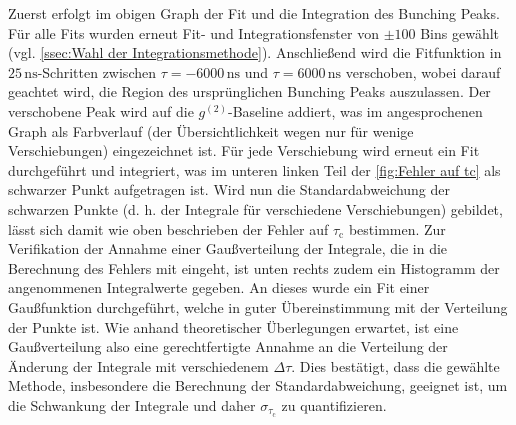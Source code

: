 Zuerst erfolgt im obigen Graph der Fit und die Integration des Bunching Peaks. 
Für alle Fits wurden erneut Fit- und Integrationsfenster von $\pm 100$ Bins gewählt (vgl. \autoref{ssec:Wahl der Integrationsmethode}). 
Anschließend wird die Fitfunktion in $25\,\mathrm{ns}$-Schritten zwischen $\tau = -6000\,\mathrm{ns}$ und $\tau = 6000\,\mathrm{ns}$ verschoben, wobei darauf geachtet wird, die Region des ursprünglichen Bunching Peaks auszulassen. 
Der verschobene Peak wird auf die $g^{(2)}$-Baseline addiert, was im angesprochenen Graph als Farbverlauf (der Übersichtlichkeit wegen nur für wenige Verschiebungen) eingezeichnet ist. 
Für jede Verschiebung wird erneut ein Fit durchgeführt und integriert, was im unteren linken Teil der \autoref{fig:Fehler auf tc} als schwarzer Punkt aufgetragen ist. 
Wird nun die Standardabweichung der schwarzen Punkte (d. h. der Integrale für verschiedene Verschiebungen) gebildet, lässt sich damit wie oben beschrieben der Fehler auf $\tau_{\mathrm{c}}$ bestimmen. 
Zur Verifikation der Annahme einer Gaußverteilung der Integrale, die in die Berechnung des Fehlers mit eingeht, ist unten rechts zudem ein Histogramm der angenommenen Integralwerte gegeben. 
An dieses wurde ein Fit einer Gaußfunktion durchgeführt, welche in guter Übereinstimmung mit der Verteilung der Punkte ist. 
Wie anhand theoretischer Überlegungen erwartet, ist eine Gaußverteilung also eine gerechtfertigte Annahme an die Verteilung der Änderung der Integrale mit verschiedenem $\Delta\tau$. 
Dies bestätigt, dass die gewählte Methode, insbesondere die Berechnung der Standardabweichung, geeignet ist, um die Schwankung der Integrale und daher $\sigma_{\tau_{\mathrm{c}}}$ zu quantifizieren. 

